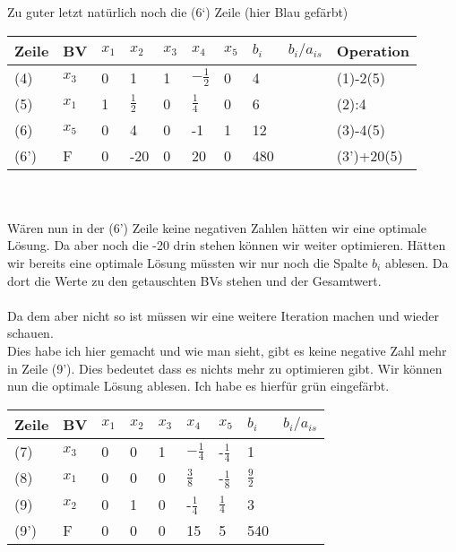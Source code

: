 \documentclass{article}
\begin{document}
Zu guter letzt natürlich noch die (6`) Zeile (hier Blau gefärbt)\\
\begin{tabular}{|l|l|l|l|l|l|l|l|l|l|}
	\hline
	Zeile & BV &$x_{1}$&$x_{2}$&$x_{3}$&$x_{4}$&$x_{5}$&$b_{i}$&$b_{i}/a_{is}$&Operation\\
	\hline
	(4)&$x_{3}$&0&1&1&$-\frac{1}{2}$&0&4&&(1)-2(5)\\
	\hline
	(5)&$x_{1}$&1&$\frac{1}{2}$&0&$\frac{1}{4}$&0&6&&(2):4\\
	\hline
	(6)&$x_{5}$&0&4&0&-1&1&12&&(3)-4(5)\\
	\hline
	(6')&F&\cellcolor{blue}0&\cellcolor{blue}-20&\cellcolor{blue}0&\cellcolor{blue}20&\cellcolor{blue}0&\cellcolor{blue}480&&(3')+20(5)\\
	\hline
\end{tabular}\\\\
Wären nun in der (6') Zeile keine negativen Zahlen hätten wir eine optimale Lösung. Da aber noch die -20 drin stehen können wir weiter optimieren. Hätten wir bereits eine optimale Lösung müssten wir nur noch die Spalte $b_{i}$ ablesen. Da dort die Werte zu den getauschten BVs stehen und der Gesamtwert.\\\\
Da dem aber nicht so ist müssen wir eine weitere Iteration machen und wieder schauen.\\
Dies habe ich hier gemacht und wie man sieht, gibt es keine negative Zahl mehr in Zeile (9'). Dies bedeutet dass es nichts mehr zu optimieren gibt. Wir können nun die optimale Lösung ablesen. Ich habe es hierfür grün eingefärbt. 
\begin{tabular}{|l|l|l|l|l|l|l|l|l|}
	\hline
	Zeile & BV &$x_{1}$&$x_{2}$&$x_{3}$&$x_{4}$&$x_{5}$&$b_{i}$&$b_{i}/a_{is}$\\
	\hline
	(7)&$x_{3}$&0&0&1&$-\frac{1}{4}$&-$\frac{1}{4}$&1&\\
	\hline
	(8)&\cellcolor{green}$x_{1}$&0&0&0&$\frac{3}{8}$&-$\frac{1}{8}$&\cellcolor{green}$\frac{9}{2}$&\\
	\hline
	(9)&\cellcolor{green}$x_{2}$&0&1&0&-$\frac{1}{4}$&$\frac{1}{4}$&\cellcolor{green}3&\\
	\hline
	(9')&\cellcolor{green}F&0&0&0&15&5&\cellcolor{green}540&\\
	\hline
\end{tabular}\\\\
\end{document}
